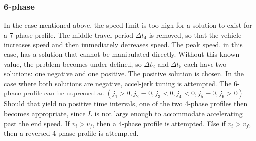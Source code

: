 \documentclass[letterpaper, 10 pt, conference]{ieeeconf}  %
\begin{document}
\subsubsection{6-phase} \label{sec:6phase}

In the case mentioned above, the speed limit is too high for a solution to exist for a 7-phase profile.
The middle travel period $\Delta t_4$ is removed, so that the vehicle increases speed and then immediately decreases speed. 
The peak speed, in this case, has a solution that cannot be manipulated directly.
Without this known value, the problem becomes under-defined, so $\Delta t_2$ and $\Delta t_5$ each have two solutions: one negative and one positive.
The positive solution is chosen.
In the case where both solutions are negative, accel-jerk tuning is attempted. 
The 6-phase profile can be expressed as $( j_1 > 0 , j_2 = 0 , j_3 < 0 , j_4 < 0 , j_5 = 0 , j_6 > 0 )$
Should that yield no positive time intervals, one of the two 4-phase profiles then becomes appropriate, since $L$ is not large enough to accommodate accelerating past the end speed.
If $v_i > v_f$, then a 4-phase profile is attempted. Else 
if $v_i > v_f$, then a reversed 4-phase profile is attempted.
\end{document}
